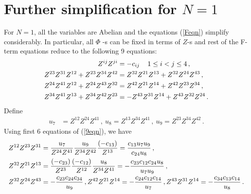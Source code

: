 \documentclass[12pt,a4paper]{JHEP3}
\newcommand{\refb}[1]{(\ref{#1})}
\newcommand{\nn}{\ensuremath{\nonumber{}}}
\begin{document}
\section{Further simplification for $N=1$} \label{appN1}
For $N=1$, all the variables are Abelian and the equations \refb{Feqn} simplify considerably.
In particular, all $\Phi$ -s can be fixed in terms of $Z$-s and rest of the F-term equations reduce to the following 9 equations:
\begin{align}
\nn
Z^{ij} Z^{ji} &= -c_{ij} \, \quad 1 \leq i < j \leq 4 \, , \\
\nn
Z^{23} Z^{31} Z^{12} +  Z^{23} Z^{34} Z^{42} &= Z^{32} Z^{21} Z^{13} + Z^{32} Z^{24} Z^{43} \, , \\
\nn
Z^{24} Z^{41} Z^{12} +  Z^{24} Z^{43} Z^{32} &= Z^{42} Z^{21} Z^{14} + Z^{42} Z^{23} Z^{34} \, , \\
Z^{34} Z^{41} Z^{13} +  Z^{34} Z^{42} Z^{23} &= - Z^{43} Z^{31} Z^{14} + Z^{43} Z^{32} Z^{24} \, . \label{9eqn}
\end{align}
Define
\begin{align}
u_7 &= Z^{12} Z^{24} Z^{41} \, ,~u_8 = Z^{13} Z^{34} Z^{41} \, ,~u_9 = Z^{23} Z^{34} Z^{42} \, .
\end{align}
Using first 6 equations  of \refb{9eqn}, we have
\begin{align}
\nn
Z^{12} Z^{23} Z^{31} &= \frac{u_7}{Z^{24} Z^{41}} \frac{u_9}{Z^{34} Z^{42}} \frac{ (-c_{13}) }{Z^{13}} = \frac{c_{13} u_7 u_9}{ c_{24} u_8} \, , \\
\nn
Z^{32} Z^{21} Z^{13} &= \frac{(-c_{23})}{Z^{23}} \frac{(-c_{12})}{Z^{12}} \frac{u_8}{Z^{34} Z^{41}} = - \frac{c_{23} c_{12} c_{24} u_8}{u_7 u_9} \, , \\
Z^{32} Z^{24} Z^{43} &= - \frac{c_{23} c_{24} c_{34}}{u_9} \, , 
Z^{42} Z^{21} Z^{14} = - \frac{c_{24} c_{12} c_{14}}{u_7} \, , 
Z^{43} Z^{31} Z^{14} = - \frac{c_{34} c_{13} c_{14} }{u_8}  \, .
\end{align}
\end{document}
